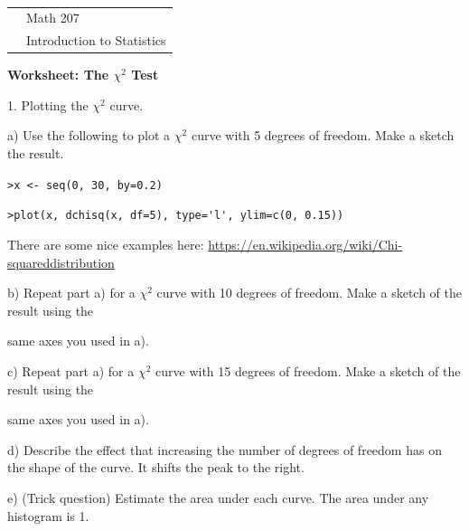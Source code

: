 \documentclass[10pt]{article}
\newcommand{\U}{\underline{\hspace{5pt}}}
\begin{document}
{{\ }\hfill\small
\begin{tabular}{cl}
& Math 207\\
& Introduction to Statistics\\
\end{tabular}
}

\medskip

\begin{center}
\textbf{\large  Worksheet:  The $\chi^2$ Test}
\end{center}
\smallskip



1.  Plotting the $\chi^2$ curve.

\hspace{20pt} a) Use the following to plot a $\chi^2$ curve with
  5 degrees of freedom.  Make a sketch the result.

\hspace{40pt}  \lstinline!>x <- seq(0, 30, by=0.2)!

\hspace{40pt}  \lstinline!>plot(x, dchisq(x, df=5), type='l', ylim=c(0, 0.15))!

{\color{blue}  There are some nice examples here:
\href{https://en.wikipedia.org/wiki/Chi-squared_distribution}{https://en.wikipedia.org/wiki/Chi-squared\U distribution}}
\vspace{1.2in}

\hspace{20pt} b) Repeat part a) for a $\chi^2$ curve with
  10 degrees of freedom.  Make a sketch of the result using the\vspace{-4pt}

\hspace{20pt}\hphantom{b) } same axes you
  used in a).

\hspace{20pt} c) Repeat part a) for a $\chi^2$ curve with
  15 degrees of freedom. Make a sketch of the result using the\vspace{-4pt}

\hspace{20pt}\hphantom{b) } same axes you
  used in a).

\hspace{20pt} d) Describe the effect that increasing the number of degrees of
  freedom has on the shape of the curve.
{\color{blue} It shifts the peak to the right.}
\vspace{.5in}

\hspace{20pt} e) (Trick question) Estimate the area under each curve. {\color{blue}The area under
any histogram is 1.}
\bigskip
\end{document}
